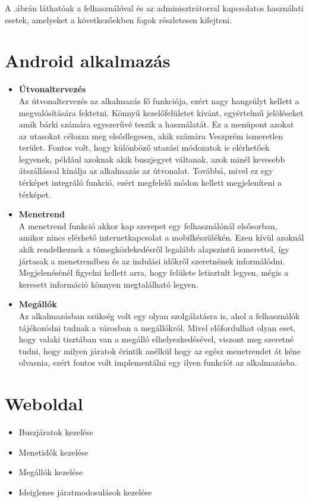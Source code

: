 A .ábrán láthatóak a felhasználóval és az adminisztrátorral kapcsolatos használati esetek, amelyeket a következőekben fogok részletesen kifejteni.

\section*{Android alkalmazás}
\begin{itemize}
	\item \textbf{Útvonaltervezés}
	\\
	Az útvonaltervezés az alkalmazás fő funkciója, ezért nagy hangsúlyt kellett a megvalósítására fektetni. 
	Könnyű kezelőfelületet kívánt, egyértelmű jelöléseket amik bárki számára egyszerűvé teszik a használatát. 
	Ez a menüpont azokat az utasokat célozza meg elsődlegesen, akik számára Veszprém ismeretlen terület. 
	Fontos volt, hogy különböző utazási módozatok is elérhetőek legyenek, például azoknak akik buszjegyet váltanak, azok minél kevesebb átszállással kínálja az alkalmazás az útvonalat. 
	Továbbá, mivel ez egy térképet integráló funkció, ezért megfelelő módon kellett megjeleníteni a térképet. 	
	\item \textbf{Menetrend}
	\\
	A menetrend funkció akkor kap szerepet egy felhasználónál elsősorban, amikor nincs elérhető internetkapcsolat a mobilkészülékén. 
	Ezen kívül azoknál akik rendelkeznek a tömegközlekedésről legalább alapszintű ismerettel, így jártasak a menetrendben és az indulási időkről szeretnének informálódni. 
	Megjelenésénél figyelni kellett arra, hogy felülete letisztult legyen, mégis a keresett információ könnyen megtalálható legyen. 	
	\item \textbf{Megállók}
	\\
	Az alkalmazásban szükség volt egy olyan szolgálatásra is, ahol a felhasználók tájékozódni tudnak a városban a megállókról. 
	Mivel előfordulhat olyan eset, hogy valaki tisztában van a megálló elhelyezkedésével, viszont meg szeretné tudni, hogy milyen járatok érintik anélkül hogy az egész menetrendet át kéne olvasnia, ezért fontos volt implementálni egy ilyen funkciót az alkalmazásba. 
\end{itemize}
\section*{Weboldal}
\begin{itemize}
	\item Buszjáratok kezelése
	\item Menetidők kezelése
	\item Megállók kezelése
	\item Ideiglenes járatmodosulások kezelése
\end{itemize}
	
